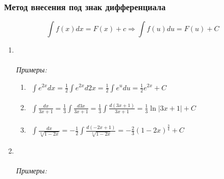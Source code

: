 \documentclass[12pt, fleqn]{book}
\begin{document}
	\subsubsection{Метод внесения под знак дифференциала}
	\begin{equation*}
		\int f(x)dx=F(x)+c \Rightarrow \int f(u)du=F(u)+C
	\end{equation*}
	\begin{enumerate}[1.]
		\item {}\\\\
		\textit{Примеры:}
		\begin{enumerate}[1)]
			\item $\begin{gathered}
				\int e^{2x}dx=\frac{1}{2}\int e^{2x}d2x=\frac{1}{2}\int e^udu=\frac{1}{2}e^{2x}+C
			\end{gathered}$
			\item $\begin{gathered}
				\int \frac{dx}{3x+1}=\frac{1}{3}\int \frac{d3x}{3x+1}=\frac{1}{3}\int \frac{d(3x+1)}{3x+1}=\frac{1}{3}\ln\left|3x+1 \right|+C
			\end{gathered}$
			\item $\begin{gathered}
				\int \frac{dx}{\sqrt[4]{1-2x}}=-\frac{1}{2}\int \frac{d(-2x+1)}{\sqrt[4]{1-2x}}=-\frac{2}{3}\left(1-2x\right)^\frac{3}{4}+C
			\end{gathered}$
		\end{enumerate}
		\item {}\\\\
		\textit{Примеры:}
\end{enumerate}
\end{document}
